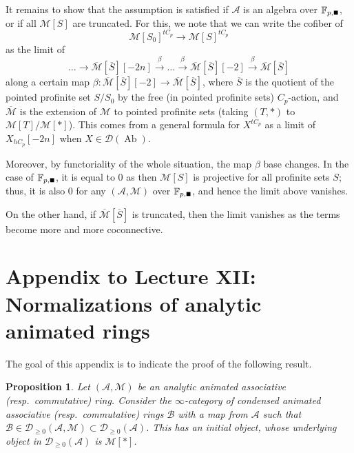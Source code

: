 \documentclass[11pt]{amsbook}
\DeclareMathOperator{\Ab}{Ab}
\newcommand{\solid}{{\mathsmaller{\blacksquare}}}
\numberwithin{equation}{section}
\numberwithin{theorem}{section}
\newtheorem{proposition}[theorem]{Proposition}
\theoremstyle{definition}
\begin{document}
It remains to show that the assumption is satisfied if $\mathcal A$ is an algebra over $\mathbb F_{p,\solid}$, or if all $\mathcal M[S]$ are truncated. For this, we note that we can write the cofiber of
\[
\mathcal M[S_0]^{tC_p}\to \mathcal M[S]^{tC_p}
\]
as the limit of
\[
\ldots\to \overline{\mathcal M}[\overline{S}][-2n]\xrightarrow{\beta}\ldots\xrightarrow{\beta} \overline{\mathcal M}[\overline{S}][-2]\xrightarrow{\beta}\overline{\mathcal M}[\overline{S}]
\]
along a certain map $\beta: \overline{\mathcal M}[\overline{S}][-2]\to \overline{\mathcal M}[\overline{S}]$, where $\overline{S}$ is the quotient of the pointed profinite set $S/S_0$ by the free (in pointed profinite sets) $C_p$-action, and $\overline{\mathcal M}$ is the extension of $\mathcal M$ to pointed profinite sets (taking $(T,\ast)$ to $\mathcal M[T]/\mathcal M[\ast]$). This comes from a general formula for $X^{tC_p}$ as a limit of $X_{hC_p}[-2n]$ when $X\in\mathcal D(\Ab)$.

Moreover, by functoriality of the whole situation, the map $\beta$ base changes. In the case of $\mathbb F_{p,\solid}$, it is equal to $0$ as then $\mathcal M[S]$ is projective for all profinite sets $S$; thus, it is also $0$ for any $(\mathcal A,\mathcal M)$ over $\mathbb F_{p,\solid}$, and hence the limit above vanishes.

On the other hand, if $\overline{\mathcal M}[\overline{S}]$ is truncated, then the limit vanishes as the terms become more and more coconnective.
\newpage

\section*{Appendix to Lecture XII: Normalizations of analytic animated rings}

The goal of this appendix is to indicate the proof of the following result.

\begin{proposition} Let $(\mathcal A,\mathcal M)$ be an analytic animated associative (resp.~commutative) ring. Consider the $\infty$-category of condensed animated associative (resp.~commutative) rings $\mathcal B$ with a map from $\mathcal A$ such that $\mathcal B\in\mathcal D_{\geq 0}(\mathcal A,\mathcal M)\subset \mathcal D_{\geq 0}(\mathcal A)$. This has an initial object, whose underlying object in $\mathcal D_{\geq 0}(\mathcal A)$ is $\mathcal M[\ast]$.
\end{proposition}
\end{document}

